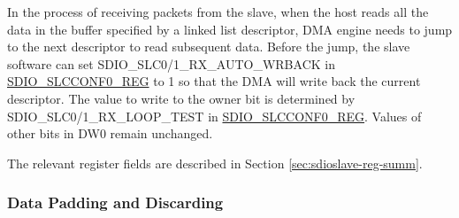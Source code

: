 \documentclass[main\_\_EN.tex]{subfiles}
\begin{document}
In the process of receiving packets from the slave, when the host reads all the data in the buffer specified by a linked list descriptor, DMA engine needs to jump to the next descriptor to read subsequent data. Before the jump, the slave software can set SDIO\_SLC0/1\_RX\_AUTO\_WRBACK in \hyperref[regdesc:SDIOSLCCONF0REG]{SDIO\_SLCCONF0\_REG} to 1 so that the DMA will write back the current descriptor. The value to write to the owner bit is determined by SDIO\_SLC0/1\_RX\_LOOP\_TEST in \hyperref[regdesc:SDIOSLCCONF0REG]{SDIO\_SLCCONF0\_REG}. Values of other bits in DW0 remain unchanged.

The relevant register fields are described in Section \ref{sec:sdioslave-reg-summ}.

\subsubsection{Data Padding and Discarding}
\label{sec:sdioslave-dummy-data}
\end{document}
